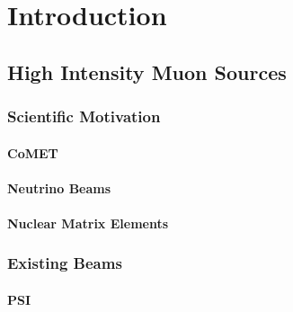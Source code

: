 \part{Introduction} %
\label{prt:introduction}
\chapter{High Intensity Muon Sources} %
\label{cha:high_intensity_muon_sources}
\section{Scientific Motivation} %
\label{sec:scientific_motivation}
\subsection{CoMET} %
\label{sub:comet}

\subsection{Neutrino Beams} %
\label{sub:neutrino_beams}

\subsection{Nuclear Matrix Elements} %
\label{sub:nuclear_matrix_elements}

\section{Existing Beams} %
\label{sec:existing_beams}
\subsection{PSI} %
\label{sub:psi}

